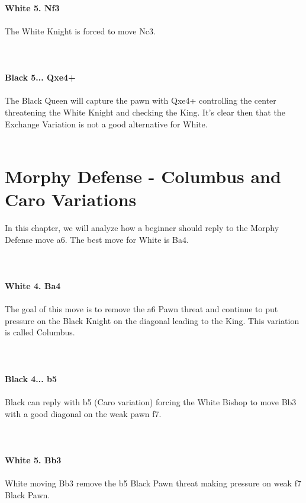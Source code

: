\documentclass{article}
\begin{document}
\\
\textbf{White 5. Nf3}\\
\\
The White Knight is forced to move Nc3.\\
\\

\\
\\
\textbf{Black 5... Qxe4+}\\
\\
The Black Queen will capture the pawn with Qxe4+ controlling the center threatening the White Knight and checking the King. It's clear then that the Exchange Variation is not a good alternative for White.\\
\\
\section{ Morphy Defense - Columbus and Caro Variations}

In this chapter, we will analyze how a beginner should reply to the Morphy Defense move a6. The best move for White is Ba4.\\
\\

\\
\\
\textbf{White 4. Ba4}\\
\\
The goal of this move is to remove the a6 Pawn threat and continue to put pressure on the Black Knight on the diagonal leading to the King. This variation is called Columbus.\\
\\

\\
\\
\textbf{Black 4... b5}\\
\\
Black can reply with b5 (Caro variation) forcing the White Bishop to move Bb3 with a good diagonal on the weak pawn f7.\\
\\

\\
\\
\textbf{White 5. Bb3}\\
\\
White moving Bb3 remove the b5 Black Pawn threat making pressure on weak f7 Black Pawn.\\
\\
\end{document}
